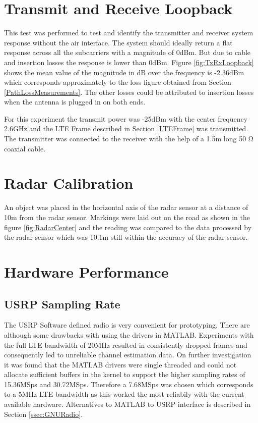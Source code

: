 \section{Transmit and Receive Loopback}

This test was performed to test and identify the transmitter and receiver system response without the air interface. The system should ideally return a flat response across all the subcarriers with a magnitude of 0dBm. But due to cable and insertion losses the response is lower than 0dBm. Figure \ref{fig:TxRxLoopback} shows the mean value of the magnitude in dB over the frequency is -2.36dBm which corresponds approximately to the loss figure obtained from Section \ref{PathLossMeasurements}. The other losses could be attributed to insertion losses when the antenna is plugged in on both ends.

For this experiment the transmit power was -25dBm with the center frequency 2.6GHz and the LTE Frame described in Section \ref{LTEFrame} was transmitted. The transmitter was connected to the receiver with the help of a 1.5m long 50 \si{\ohm} coaxial cable.

\section{Radar Calibration}

An object was placed in the horizontal axis of the radar sensor at a distance of 10m from the radar sensor. Markings were laid out on the road as shown in the figure \ref{fig:RadarCenter} and the reading was compared to the data processed by the radar sensor which was 10.1m still within the accuracy of the radar sensor.

\section{Hardware Performance}

\subsection{USRP Sampling Rate}\label{ssec:USRPSamplingRate}
The USRP Software defined radio is very convenient for prototyping. There are although some drawbacks with using the drivers in MATLAB. Experiments with the full LTE bandwidth of 20MHz resulted in consistently dropped frames and consequently led to unreliable channel estimation data. On further investigation it was found that the MATLAB drivers were single threaded and could not allocate sufficient buffers in the kernel to support the higher sampling rates of 15.36MSps and 30.72MSps. Therefore a 7.68MSps was chosen which corresponds to a 5MHz LTE bandwidth as this worked the most reliabily with the current available hardware. Alternatives to MATLAB to USRP interface is described in Section \ref{ssec:GNURadio}.

